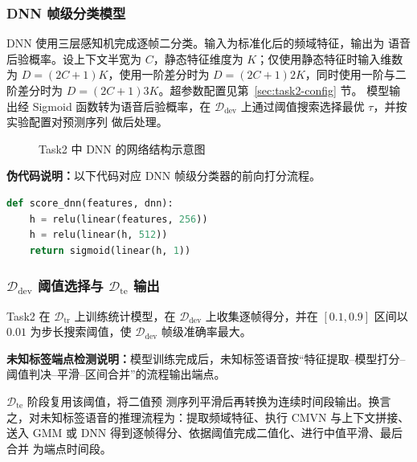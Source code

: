 \documentclass[a4paper]{article}
\begin{document}
\subsubsection{DNN 帧级分类模型}
\label{sec:dnn-model}

DNN 使用三层感知机完成逐帧二分类。输入为标准化后的频域特征，输出为
语音后验概率。设上下文半宽为 $C$，静态特征维度为 $K$；仅使用静态特征时输入维数为
$D=(2C+1)K$，使用一阶差分时为 $D=(2C+1)2K$，同时使用一阶与二阶差分时为
$D=(2C+1)3K$。超参数配置见第~\ref{sec:task2-config} 节。
模型输出经 Sigmoid
函数转为语音后验概率，在 $\mathcal{D}_{\text{dev}}$ 上通过阈值搜索选择最优 $\tau$，并按实验配置对预测序列
做后处理。

\begin{figure}[ht]
  \centering
  \caption{Task2 中 DNN 的网络结构示意图}
  \label{fig:dnn-arch}
\end{figure}

\textbf{伪代码说明：}以下代码对应 DNN 帧级分类器的前向打分流程。

\begin{lstlisting}[language=python]
def score_dnn(features, dnn):
    h = relu(linear(features, 256))
    h = relu(linear(h, 512))
    return sigmoid(linear(h, 1))
\end{lstlisting}

\subsubsection{\texorpdfstring{$\mathcal{D}_{\text{dev}}$ 阈值选择与 $\mathcal{D}_{\text{te}}$ 输出}{Ddev 阈值选择与 Dte 输出}}

Task2 在 $\mathcal{D}_{\text{tr}}$ 上训练统计模型，在 $\mathcal{D}_{\text{dev}}$ 上收集逐帧得分，并在
$[0.1,0.9]$ 区间以 $0.01$ 为步长搜索阈值，使 $\mathcal{D}_{\text{dev}}$ 帧级准确率最大。

\textbf{未知标签端点检测说明：}模型训练完成后，未知标签语音按“特征提取--模型打分--阈值判决--平滑--区间合并”的流程输出端点。

$\mathcal{D}_{\text{te}}$ 阶段复用该阈值，将二值预
测序列平滑后再转换为连续时间段输出。换言之，对未知标签语音的推理流程为：提取频域特征、执行
CMVN 与上下文拼接、送入 GMM 或 DNN 得到逐帧得分、依据阈值完成二值化、进行中值平滑、最后合并
为端点时间段。
\end{document}
